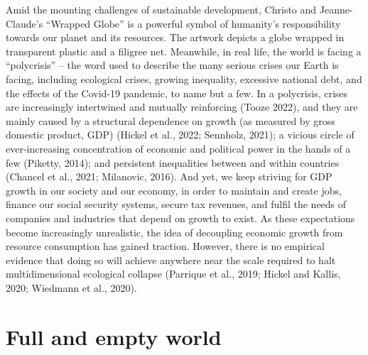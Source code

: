 \documentclass[
  letterpaper,
  DIV=11,
  numbers=noendperiod]{scrreprt}
\begin{document}
Amid the mounting challenges of sustainable development, Christo and
Jeanne-Claude's ``Wrapped Globe'' is a powerful symbol of humanity's
responsibility towards our planet and its resources. The artwork depicts
a globe wrapped in transparent plastic and a filigree net. Meanwhile, in
real life, the world is facing a ``polycrisis'' -- the word used to
describe the many serious crises our Earth is facing, including
ecological crises, growing inequality, excessive national debt, and the
effects of the Covid-19 pandemic, to name but a few. In a polycrisis,
crises are increasingly intertwined and mutually reinforcing (Tooze
2022), and they are mainly caused by a structural dependence on growth
(as measured by gross domestic product, GDP) (Hickel et al., 2022;
Sennholz, 2021); a vicious circle of ever-increasing concentration of
economic and political power in the hands of a few (Piketty, 2014); and
persistent inequalities between and within countries (Chancel et al.,
2021; Milanovic, 2016). And yet, we keep striving for GDP growth in our
society and our economy, in order to maintain and create jobs, finance
our social security systems, secure tax revenues, and fulfil the needs
of companies and industries that depend on growth to exist. As these
expectations become increasingly unrealistic, the idea of decoupling
economic growth from resource consumption has gained traction. However,
there is no empirical evidence that doing so will achieve anywhere near
the scale required to halt multidimensional ecological collapse
(Parrique et al., 2019; Hickel and Kallis, 2020; Wiedmann et al., 2020).

\section{Full and empty world}\label{full-and-empty-world}
\end{document}
